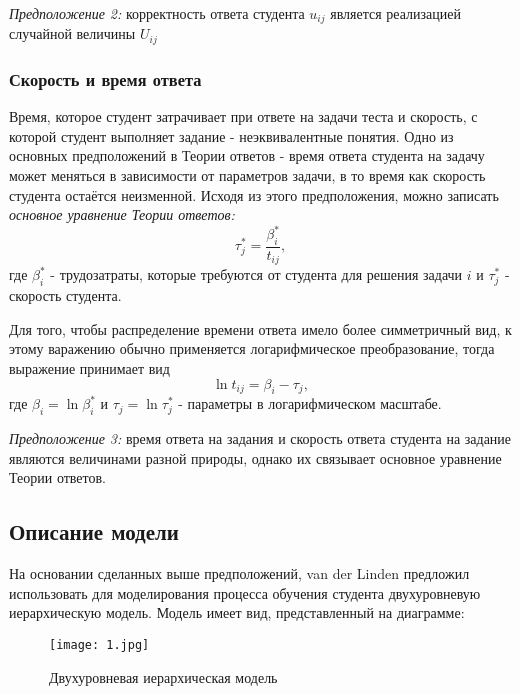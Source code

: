 {\itshape Предположение 2:} корректность ответа студента $u_{ij}$ является реализацией случайной величины $U_{ij}$

\subsubsection{Скорость и время ответа}

Время, которое студент затрачивает при ответе на задачи теста и  скорость, с которой студент выполняет задание - неэквивалентные понятия. Одно из основных предположений в  Теории ответов - время ответа студента на задачу может меняться в зависимости от параметров задачи, в то время как скорость студента остаётся неизменной. Исходя из этого предположения, можно за\-писать {\itshape основное уравнение Теории ответов:}
\begin{equation}
\tau_{j}^{*} = \frac{\beta^{*}_{i}}{t_{ij}},
\end{equation}
где $\beta^{*}_{i}$ - трудозатраты, которые требуются от студента для решения задачи $i$ и $\tau_{j}^{*}$ - скорость студента.

Для того, чтобы распределение времени ответа имело более симметричный вид, к этому варажению обычно применяется лога\-рифмическое преобразо\-вание, тогда выражение при\-нимает вид
\begin{equation}
\ln {t_{ij}} = \beta_{i} - \tau_{j},
\end{equation}
где $\beta_{i} = \ln \beta^{*}_{i}$ и $\tau_{j} = \ln \tau^{*}_{j}$ - параметры в логарифмическом масштабе.

{\itshape Предположение 3:} время ответа на задания и скорость ответа студента на задание являются величинами разной природы, однако их связывает основное уравнение Теории ответов.

\newpage
\subsection{Описание модели}

\label{detmodel} 

На основании сделанных выше предположений, van der Linden предложил использовать для моделирования процесса обучения студента двухуровневую иерархическую модель. Модель имеет вид, представленный на диаграмме:

\begin{figure}[ht!] 
\centering \texttt{[image: 1.jpg]} 
\caption{Двухуровневая иерархическая модель} 
\end{figure}

